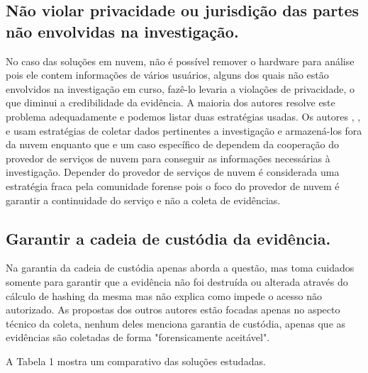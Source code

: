 \documentclass[conference]{IEEEtran}
\begin{document}
\subsection{Não violar privacidade ou jurisdição das partes não envolvidas na investigação.}

No caso das soluções em nuvem, não é possível remover o hardware para análise pois ele contem informações de vários usuários, alguns dos quais não estão envolvidos na 
investigação em curso, fazê-lo levaria a violações de privacidade, o que diminui a credibilidade da evidência. A maioria dos autores resolve este problema adequadamente 
e podemos listar duas estratégias usadas. Os autores \cite{Reichert2015}, \cite{George2012}, \cite{Poisel2013} e \cite{Dykstra2013} usam estratégias de coletar dados 
pertinentes a investigação e armazená-los fora da nuvem enquanto que \cite{Sang2013} e um caso específico de \cite{George2012} dependem da cooperação do provedor de 
serviços de nuvem para conseguir as informações necessárias à investigação. Depender do provedor de serviços de nuvem é considerada uma estratégia fraca pela comunidade 
forense pois o foco do provedor de nuvem é garantir a continuidade do serviço e não a coleta de evidências.

\subsection{Garantir a cadeia de custódia da evidência.}

Na garantia da cadeia de custódia apenas \cite{Sang2013} aborda a questão, mas toma cuidados somente para garantir que a evidência não foi destruída ou alterada
através do cálculo de hashing da mesma mas não explica como impede o acesso não autorizado. As propostas dos outros autores estão focadas apenas no aspecto técnico 
da coleta, nenhum deles menciona garantia de custódia, apenas que as evidências são coletadas de forma "forensicamente aceitável".

A Tabela 1 mostra um comparativo das soluções estudadas.
\end{document}
